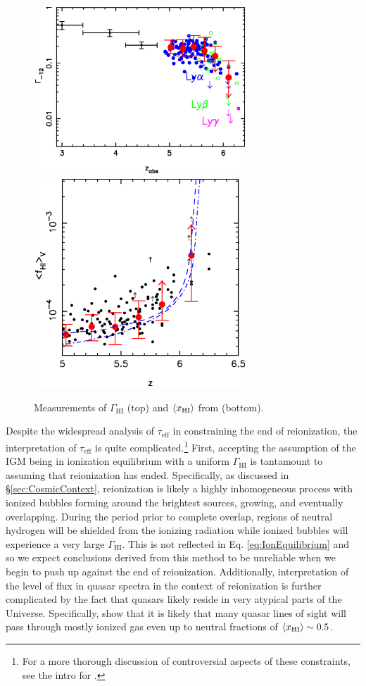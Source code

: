 \begin{figure}[h]
  \centering
  \includegraphics[width=8cm]{Fan.gamma.eps}
  \includegraphics[width=8cm]{Fan.fHv.eps}
  \caption{Measurements of $\Gamma_{\text{HI}}$ (top) and $\langle x_{\text{HI}}\rangle$ from \cite{Fan2006a} (bottom).}
  \label{fig:tauEffResults}
\end{figure}


Despite the widespread analysis of $\tau_{\text{eff}}$ in constraining the end of reionization, the interpretation of $\tau_{\text{eff}}$ is quite complicated.\footnote{For a more thorough discussion of controversial aspects of these constraints, see the intro for \cite{McGreer:2011dm}.} First, accepting the assumption of the IGM being in ionization equilibrium with a uniform $\Gamma_{\text{HI}}$ is tantamount to assuming that reionization has ended. Specifically, as discussed in \S \ref{sec:CosmicContext}, reionization is likely a highly inhomogeneous process with ionized bubbles forming around the brightest sources, growing, and eventually overlapping. During the period prior to complete overlap, regions of neutral hydrogen will be shielded from the ionizing radiation while ionized bubbles will experience a very large $\Gamma_{\text{HI}}$. This is not reflected in Eq. \ref{eq:IonEquilibrium} and so we expect conclusions derived from this method to be unreliable when we begin to push up against the end of reionization. Additionally, interpretation of the level of flux in quasar spectra in the context of reionization is further complicated by the fact that quasars likely reside in very atypical parts of the Universe. Specifically, \cite{Lidz:2007mz} show that it is likely that many quasar lines of sight will pass through mostly ionized gas even up to neutral fractions of $\langle x_{\text{HI}}\rangle \sim 0.5$. 

